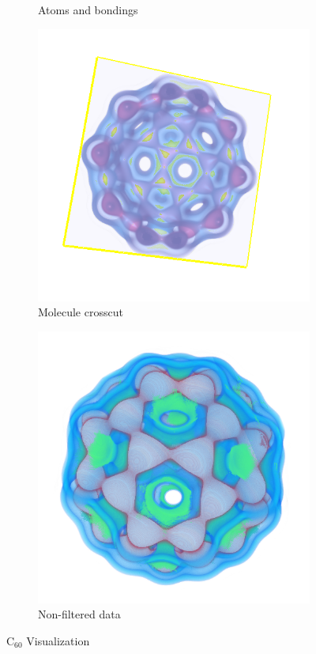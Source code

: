 \documentclass{article}
\begin{document}
\begin{figure}
\begin{subfigure}[h]{0.2\textwidth}
		\caption{Atoms and bondings}
		\label{fig:bondings}
	\end{subfigure}
	\begin{subfigure}[h]{0.2\textwidth}
		\includegraphics[width=\textwidth]{crosscut.png}
		\caption{Molecule crosscut}
		\label{fig:crosscut}
	\end{subfigure}
	\begin{subfigure}[h]{0.2\textwidth}
		\includegraphics[width=\textwidth]{2d-view.png}
		\caption{Non-filtered data}
		\label{fig:2ndview}
	\end{subfigure}
	\caption{$\text{C}_{60}$ Visualization}\label{fig:1}
\end{figure}
\end{document}
